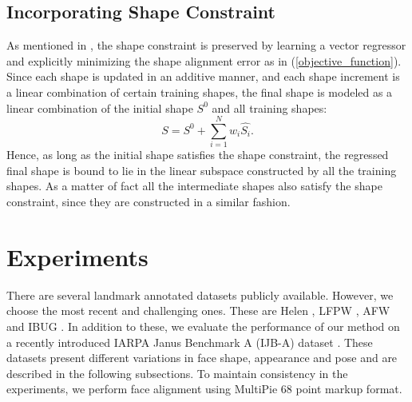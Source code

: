 \documentclass[10pt,twocolumn,letterpaper]{article}
\begin{document}
\subsection{Incorporating Shape Constraint} As mentioned in \cite{DBLP:journals/ijcv/CaoWWS14}, the shape constraint is preserved by learning a vector regressor and explicitly minimizing the shape alignment error as in (\ref{objective_function}). Since each shape is updated in an additive manner, and each shape increment is a linear combination of certain training shapes, the final shape is modeled as a linear combination of the initial shape \textit{$S^0$} and all training shapes:
\begin{equation}
\textit{S} = \textit{$S^0$} + \sum_{\textit{i}=1}^{\textit{N}} \textit{$w_i$}\hat{\textit{$S_i$}}.
\end{equation}
Hence, as long as the initial shape satisfies the shape constraint, the regressed final shape is bound to lie in the linear subspace constructed by all the training shapes. As a matter of fact all the intermediate shapes also satisfy the shape constraint, since they are constructed in a similar fashion.

\section{Experiments}
\label{experiments}
There are several landmark annotated datasets publicly available. However, we choose the most recent and challenging ones. These are Helen \cite{Le:2012:IFF:2403072.2403124}, LFPW \cite{Belhumeur:2011:LPF:2191740.2192193}, AFW \cite{AFW_dataset_CVPR2012} and IBUG \cite{6595977}.   In addition to these, we evaluate the performance of our method on a recently introduced IARPA Janus Benchmark A (IJB-A) dataset \cite{F._2015_CVPR}.   These datasets present different variations in face shape, appearance and pose and are described in the following subsections. To maintain consistency in the experiments, we perform face alignment using MultiPie \cite{Gross:2010:MUL:1746745.1747071} 68 point markup format.
\end{document}
